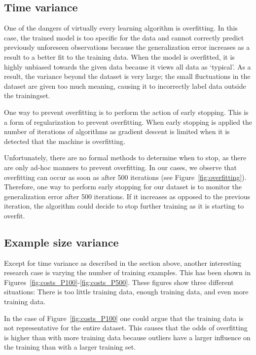 \subsection{Time variance}
One of the dangers of virtually every learning algorithm is overfitting. 
In this case, the trained model is too specific for the data and cannot correctly predict previously unforeseen observations because the generalization error increases as a result to a better fit to the training data. 
When the model is overfitted, it is highly unbiased towards the given data because it views all data as `typical'.
As a result, the variance beyond the dataset is very large; the small fluctuations in the dataset are given too much meaning, causing it to incorrectly label data outside the trainingset.

One way to prevent overfitting is to perform the action of early stopping. 
This is a form of regularization to prevent overfitting. 
When early stopping is applied the number of iterations of algorithms as gradient descent is limited when it is detected that the machine is overfitting. 

Unfortunately, there are no formal methods to determine when to stop, as there are only ad-hoc manners to prevent overfitting. 
In our cases, we observe that overfitting can occur as soon as after 500 iterations (see Figure~\ref{fig:overfitting}). 
Therefore, one way to perform early stopping for our dataset is to monitor the generalization error after 500 iterations.
If it increases as opposed to the previous iteration, the algorithm could decide to stop further training as it is starting to overfit.

\subsection{Example size variance}
Except for time variance as described in the section above, another interesting research case is varying the number of training examples. 
This has been shown in Figures~\ref{fig:costs_P100}-\ref{fig:costs_P500}.
These figures show three different situations: There is too little training data, enough training data, and even more training data. 

In the case of Figure~\ref{fig:costs_P100} one could argue that the training data is not representative for the entire dataset. 
This causes that the odds of overfitting is higher than with more training data because outliers have a larger influence on the training than with a larger training set.

